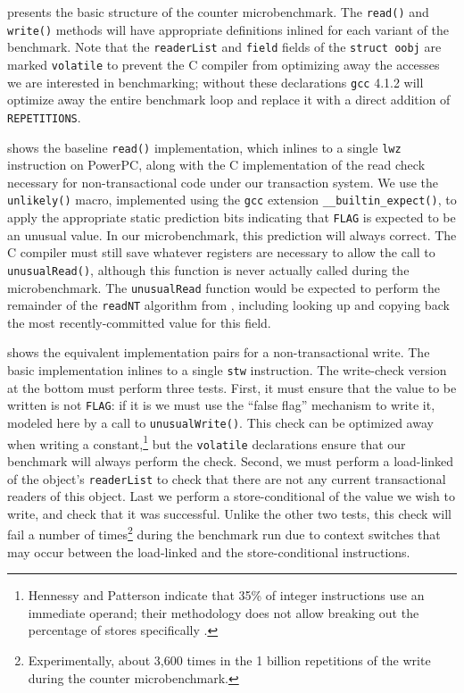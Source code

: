  presents the basic structure of the counter
microbenchmark. The \texttt{read()} and \texttt{write()} methods will
have appropriate definitions inlined for each variant of the
benchmark.  Note that the \texttt{readerList} and \texttt{field}
fields of the \texttt{struct oobj} are marked \texttt{volatile} to
prevent the C compiler from optimizing away the accesses we are
interested in benchmarking; without these declarations \texttt{gcc}
4.1.2 will optimize away the entire benchmark loop and replace it with
a direct addition of \texttt{REPETITIONS}.

 shows the baseline \texttt{read()}
implementation, which inlines to a single \texttt{lwz} instruction on
PowerPC, along with the C implementation of the read check necessary
for non-transactional code under our transaction system.  We use 
the \texttt{unlikely()} macro, implemented using the
\texttt{gcc} extension \texttt{\_\_builtin\_expect()}, to apply the
appropriate static prediction bits indicating that \texttt{FLAG} is
expected to be an unusual value.  In our microbenchmark, this
prediction will always correct.  The C compiler must still save
whatever registers are necessary to allow the call to
\texttt{unusualRead()}, although this function is never actually called
during the microbenchmark.  The \texttt{unusualRead} function would be
expected to perform the remainder of the \texttt{readNT} algorithm
from , including looking up and copying back the most
recently-committed value for this field.

 shows the equivalent implementation pairs for a
non-transactional write.  The basic implementation inlines to a single
\texttt{stw} instruction.  The write-check version at the bottom must
perform three tests.  First, it must ensure that the value to be
written is not \texttt{FLAG}: if it is we must use the ``false flag''
mechanism to write it, modeled here by a call to
\texttt{unusualWrite()}.  This check can be optimized away when
writing a constant,\footnote{Hennessy and Patterson indicate that 35\%
  of integer instructions use an immediate operand; their methodology does not
  allow breaking out the percentage of stores specifically
  \cite[p. 78]{HennessyPa96}.}
 but the \texttt{volatile} declarations ensure that
our benchmark will always perform the check.  Second, we must perform
a load-linked of the object's \texttt{readerList} to check that there
are not any current transactional readers of this object.  Last we
perform a store-conditional of the value we wish to write, and check
that it was successful.  Unlike the other two tests, this check will
fail a number of times\footnote{Experimentally, about 3,600 times in
  the 1 billion repetitions of the write during the counter microbenchmark.}
 during the benchmark run due to context switches
that may occur between the load-linked and the store-conditional
instructions.


